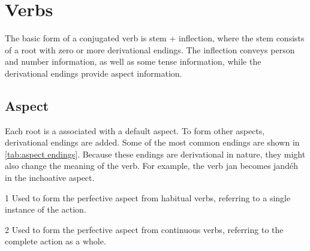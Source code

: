 \section{Verbs}
The basic form of a conjugated verb is stem + inflection, where the stem
consists of a root with zero or more derivational endings. The inflection
conveys person and number information, as well as some tense information, while
the derivational endings provide aspect information.

\subsection{Aspect}
Each root is a associated with a default aspect. To form other aspects,
derivational endings are added. Some of the most common endings are shown in
\cref{tab:aspect endings}. Because these endings are derivational in
nature, they might also change the meaning of the verb. For example, the verb
{\ll jan}  becomes {\ll jandéh}  in the inchoative
aspect.

\begin{table}[h]
\centering
\caption{Aspect Endings}
\label{tab:aspect endings}
\begin{threeparttable}
\begin{tablenotes}
\item[1] Used to form the perfective aspect from habitual verbs, referring to a
    single instance of the action.
\item[2] Used to form the perfective aspect from continuous verbs, referring to
    the complete action as a whole.
\end{tablenotes}
\end{threeparttable}
\end{table}

